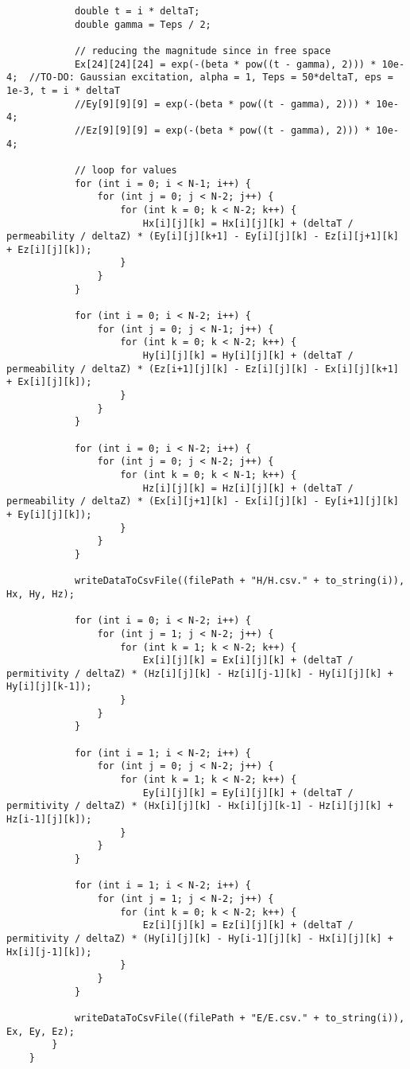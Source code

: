 \begin{verbatim}
			double t = i * deltaT;
			double gamma = Teps / 2;
			
			// reducing the magnitude since in free space
			Ex[24][24][24] = exp(-(beta * pow((t - gamma), 2))) * 10e-4;  //TO-DO: Gaussian excitation, alpha = 1, Teps = 50*deltaT, eps = 1e-3, t = i * deltaT
			//Ey[9][9][9] = exp(-(beta * pow((t - gamma), 2))) * 10e-4;
			//Ez[9][9][9] = exp(-(beta * pow((t - gamma), 2))) * 10e-4;
			
			// loop for values
			for (int i = 0; i < N-1; i++) {
				for (int j = 0; j < N-2; j++) {
					for (int k = 0; k < N-2; k++) {
						Hx[i][j][k] = Hx[i][j][k] + (deltaT / permeability / deltaZ) * (Ey[i][j][k+1] - Ey[i][j][k] - Ez[i][j+1][k] + Ez[i][j][k]);
					}
				}
			}
			
			for (int i = 0; i < N-2; i++) {
				for (int j = 0; j < N-1; j++) {
					for (int k = 0; k < N-2; k++) {
						Hy[i][j][k] = Hy[i][j][k] + (deltaT / permeability / deltaZ) * (Ez[i+1][j][k] - Ez[i][j][k] - Ex[i][j][k+1] + Ex[i][j][k]);
					}
				}
			}
			
			for (int i = 0; i < N-2; i++) {
				for (int j = 0; j < N-2; j++) {
					for (int k = 0; k < N-1; k++) {
						Hz[i][j][k] = Hz[i][j][k] + (deltaT / permeability / deltaZ) * (Ex[i][j+1][k] - Ex[i][j][k] - Ey[i+1][j][k] + Ey[i][j][k]);
					}
				}
			}
			
			writeDataToCsvFile((filePath + "H/H.csv." + to_string(i)), Hx, Hy, Hz);
			
			for (int i = 0; i < N-2; i++) {
				for (int j = 1; j < N-2; j++) {
					for (int k = 1; k < N-2; k++) {
						Ex[i][j][k] = Ex[i][j][k] + (deltaT / permitivity / deltaZ) * (Hz[i][j][k] - Hz[i][j-1][k] - Hy[i][j][k] + Hy[i][j][k-1]);
					}
				}
			}
			
			for (int i = 1; i < N-2; i++) {
				for (int j = 0; j < N-2; j++) {
					for (int k = 1; k < N-2; k++) {
						Ey[i][j][k] = Ey[i][j][k] + (deltaT / permitivity / deltaZ) * (Hx[i][j][k] - Hx[i][j][k-1] - Hz[i][j][k] + Hz[i-1][j][k]);
					}
				}
			}
			
			for (int i = 1; i < N-2; i++) {
				for (int j = 1; j < N-2; j++) {
					for (int k = 0; k < N-2; k++) {
						Ez[i][j][k] = Ez[i][j][k] + (deltaT / permitivity / deltaZ) * (Hy[i][j][k] - Hy[i-1][j][k] - Hx[i][j][k] + Hx[i][j-1][k]);
					}
				}
			}
			
			writeDataToCsvFile((filePath + "E/E.csv." + to_string(i)), Ex, Ey, Ez);
		}
	}
\end{verbatim}

